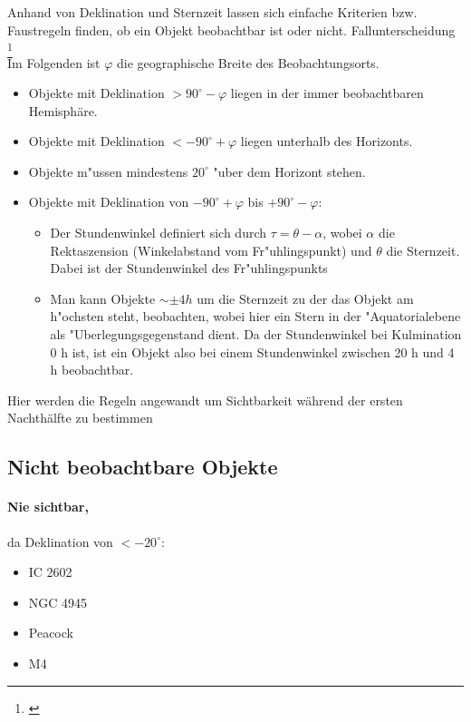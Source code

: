 Anhand von Deklination und Sternzeit lassen sich einfache Kriterien bzw. Faustregeln finden, ob ein Objekt beobachtbar ist oder nicht. 
Fallunterscheidung \footnote{\cite{kmann}}\\
Im Folgenden ist $\varphi$ die geographische Breite des Beobachtungsorts.
\begin{itemize}
\item Objekte mit Deklination  $> 90^\circ - \varphi$ liegen in der immer beobachtbaren Hemisphäre.
\item Objekte mit Deklination $< - 90^\circ + \varphi$ liegen unterhalb des Horizonts.
\item Objekte m"ussen mindestens $20^\circ$ "uber dem Horizont stehen.
\item Objekte mit Deklination von $-90^\circ + \varphi$ bis $+90^\circ - \varphi$:
\begin{itemize}
\item Der Stundenwinkel definiert sich durch $\tau=\theta - \alpha$, wobei $\alpha$ die Rektaszension (Winkelabstand vom Fr"uhlingspunkt) und $\theta$ die Sternzeit. Dabei ist der Stundenwinkel des Fr"uhlingspunkts 
\item Man kann Objekte $\sim\pm 4 h$ um die Sternzeit zu der das Objekt am h"ochsten steht, beobachten, wobei hier ein Stern in der "Aquatorialebene als "Uberlegungsgegenstand dient. Da der Stundenwinkel bei Kulmination 0 h ist, ist ein Objekt also bei einem Stundenwinkel zwischen 20 h und 4 h beobachtbar. 
\end{itemize}
\end{itemize}

Hier werden die Regeln angewandt um Sichtbarkeit während der ersten Nachthälfte zu bestimmen
\subsection{Nicht beobachtbare Objekte}
\paragraph{Nie sichtbar,} da Deklination von $<-20^\circ$:
\begin{itemize}
\item IC 2602
\item NGC 4945
\item Peacock
\item M4
\end{itemize}
